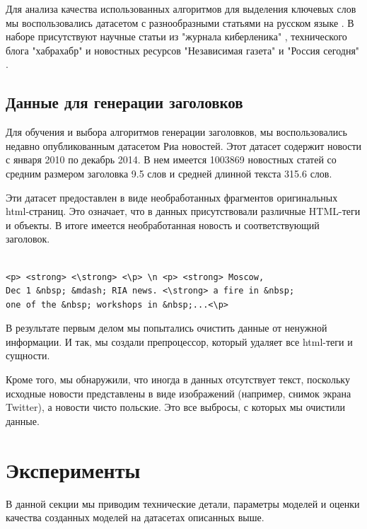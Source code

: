 \documentclass[14pt]{matmex-diploma-custom}
\begin{document}
Для анализа качества использованных алгоритмов для выделения ключевых слов
мы воспользовались датасетом с разнообразными статьями на русском языке \cite{mannefedov2019}.
В наборе присутствуют научные статьи из "журнала киберленика" \cite{cyberlenica},
технического блога "хабрахабр" \cite{habr} и новостных ресурсов "Независимая газета" \cite{independentjournal} и "Россия сегодня" \cite{rt}.


\subsection{Данные для генерации заголовков}

Для обучения и выбора алгоритмов генерации заголовков, мы воспользовались недавно опубликованным
датасетом Риа новостей. Этот датасет содержит новости с января 2010 по декабрь 2014.
В нем имеется 1003869 новостных статей со средним размером заголовка 9.5 слов и
средней длинной текста 315.6 слов.

Эти датасет предоставлен в виде необработанных фрагментов оригинальных html-страниц.
Это означает, что в данных присутствовали различные HTML-теги и объекты.
В итоге имеется необработанная новость и соответствующий заголовок.

\begin{verbatim}

<p> <strong> <\strong> <\p> \n <p> <strong> Moscow,
Dec 1 &nbsp; &mdash; RIA news. <\strong> a fire in &nbsp;
one of the &nbsp; workshops in &nbsp;...<\p>
\end{verbatim}

В результате первым делом мы попытались очистить данные от ненужной информации. И так, мы создали препроцессор, который удаляет все html-теги и сущности.

Кроме того, мы обнаружили, что иногда в данных отсутствует текст, поскольку исходные новости представлены в виде изображений (например, снимок экрана Twitter), а новости чисто польские. Это все выбросы, с которых мы очистили данные.


\section{Эксперименты}
В данной секции мы приводим технические детали, параметры моделей и оценки качества созданных моделей на датасетах описанных выше.
\end{document}
